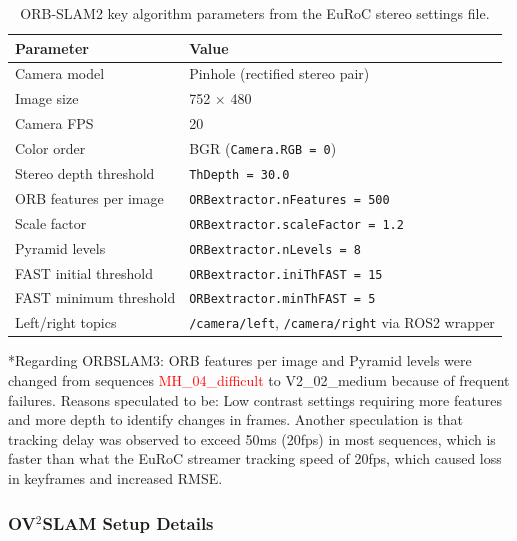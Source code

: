 \documentclass[11pt]{article}
\begin{document}
\begin{table}[H]
\centering
\small
\caption{ORB-SLAM2 key algorithm parameters from the EuRoC stereo settings file.}
\label{tab:orbslam2_algorithm_params}
\begin{tabular}{lp{9.5cm}}
\toprule
Parameter & Value \\
\midrule
Camera model & Pinhole (rectified stereo pair) \\
Image size & 752 $\times$ 480 \\
Camera FPS & 20 \\
Color order & BGR (\texttt{Camera.RGB = 0}) \\
Stereo depth threshold & \texttt{ThDepth = 30.0} \\
ORB features per image & \texttt{ORBextractor.nFeatures = 500} \\
Scale factor & \texttt{ORBextractor.scaleFactor = 1.2} \\
Pyramid levels & \texttt{ORBextractor.nLevels = 8} \\
FAST initial threshold & \texttt{ORBextractor.iniThFAST = 15} \\
FAST minimum threshold & \texttt{ORBextractor.minThFAST = 5} \\
Left/right topics & \texttt{/camera/left}, \texttt{/camera/right} via ROS2 wrapper \\
\bottomrule
\end{tabular}
\end{table}

*Regarding ORBSLAM3: ORB features per image and Pyramid levels were changed from sequences \textcolor{red}{MH\_04\_difficult} to V2\_02\_medium because of frequent failures. Reasons speculated to be: Low contrast settings requiring more features and more depth to identify changes in frames. Another speculation is that tracking delay was observed to exceed 50ms (20fps) in most sequences, which is faster than what the EuRoC streamer tracking speed of 20fps, which caused loss in keyframes and increased RMSE.

\subsubsection{OV$^{2}$SLAM Setup Details}
\end{document}
